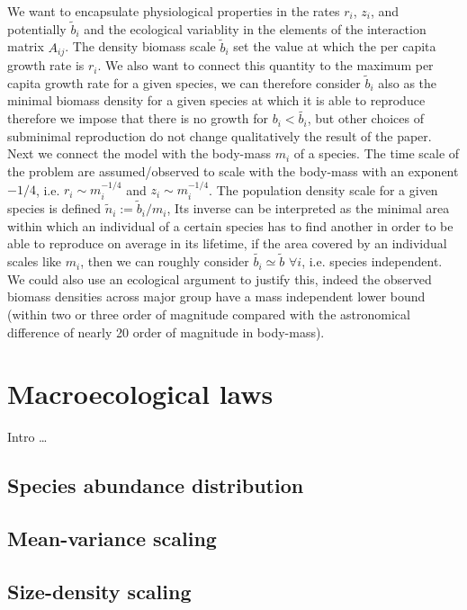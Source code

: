 \documentclass[10pt]{article}
\begin{document}
We want to encapsulate physiological properties in the
rates $r_i$, $z_i$, and potentially $\tilde{b}_i$
and the ecological variablity in the elements of
the interaction matrix $A_{ij}$.
The density biomass scale $\tilde{b}_i$ set the value at which the per capita
growth rate is $r_i$. We also want to connect this quantity to the
maximum per capita growth rate for a given species, we can therefore
consider $\tilde{b}_i$ also as the minimal biomass density for a given species
at which it is able to reproduce therefore we impose that there is no growth
for $b_i<\tilde{b_i}$, but other choices of subminimal reproduction do not change
qualitatively the result of the paper.
Next we connect the model with the body-mass $m_i$ of a species. 
The time scale of the problem are assumed/observed to scale with the body-mass
with an exponent $-1/4$, i.e. $r_i\sim m_i^{-1/4}$ and $z_i\sim m_i^{-1/4}$.
The population density scale
for a given species is defined $\tilde{n}_i:=\tilde{b}_i/m_i$,
Its inverse can be interpreted as the minimal area within which an individual
of a certain species has to find another in order to be able to reproduce
on average in its lifetime, if the area covered by an individual
scales like $m_i$, then we can roughly consider $\tilde{b_i}\simeq\tilde{b}$ $\forall i$,
i.e. species independent. We could also use an ecological argument
to justify this, indeed the observed biomass densities across major group
have a mass independent lower bound (within two or three order of magnitude compared
with the astronomical difference of nearly 20 order of magnitude in body-mass).


\section{Macroecological laws}
Intro \dots

\subsection{Species abundance distribution}

\subsection{Mean-variance scaling}

\subsection{Size-density scaling}
\end{document}
